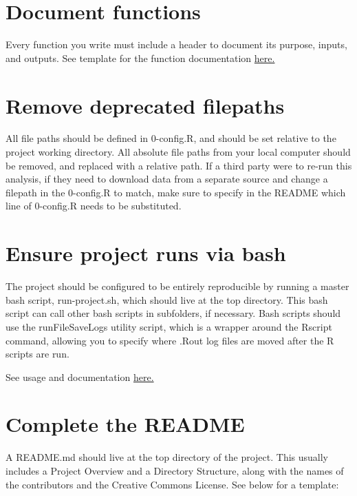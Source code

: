 \documentclass[
]{book}
\begin{document}
\section{Document functions}\label{document-functions}

Every function you write must include a header to document its purpose, inputs, and outputs. See template for the function documentation \href{https://jadebc.github.io/lab-manual/coding-practices.html\#function-documentation}{here.}

\section{Remove deprecated filepaths}\label{remove-deprecated-filepaths}

All file paths should be defined in 0-config.R, and should be set relative to the project working directory. All absolute file paths from your local computer should be removed, and replaced with a relative path. If a third party were to re-run this analysis, if they need to download data from a separate source and change a filepath in the 0-config.R to match, make sure to specify in the README which line of 0-config.R needs to be substituted.

\section{Ensure project runs via bash}\label{ensure-project-runs-via-bash}

The project should be configured to be entirely reproducible by running a master bash script, run-project.sh, which should live at the top directory. This bash script can call other bash scripts in subfolders, if necessary. Bash scripts should use the runFileSaveLogs utility script, which is a wrapper around the Rscript command, allowing you to specify where .Rout log files are moved after the R scripts are run.

See usage and documentation \href{https://jadebc.github.io/lab-manual/unix.html\#example-code-for-runfilesavelogs}{here.}

\section{Complete the README}\label{complete-the-readme}

A README.md should live at the top directory of the project. This usually includes a Project Overview and a Directory Structure, along with the names of the contributors and the Creative Commons License. See below for a template:
\end{document}
